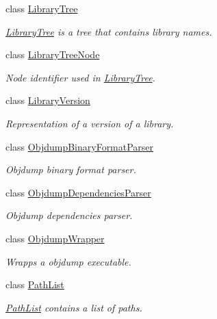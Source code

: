 \begin{DoxyCompactItemize}
class \hyperlink{class_mdt_1_1_deploy_utils_1_1_library_tree}{Library\+Tree}
\begin{DoxyCompactList}\small\item\em \hyperlink{class_mdt_1_1_deploy_utils_1_1_library_tree}{Library\+Tree} is a tree that contains library names. \end{DoxyCompactList}\item 
class \hyperlink{class_mdt_1_1_deploy_utils_1_1_library_tree_node}{Library\+Tree\+Node}
\begin{DoxyCompactList}\small\item\em Node identifier used in \hyperlink{class_mdt_1_1_deploy_utils_1_1_library_tree}{Library\+Tree}. \end{DoxyCompactList}\item 
class \hyperlink{class_mdt_1_1_deploy_utils_1_1_library_version}{Library\+Version}
\begin{DoxyCompactList}\small\item\em Representation of a version of a library. \end{DoxyCompactList}\item 
class \hyperlink{class_mdt_1_1_deploy_utils_1_1_objdump_binary_format_parser}{Objdump\+Binary\+Format\+Parser}
\begin{DoxyCompactList}\small\item\em Objdump binary format parser. \end{DoxyCompactList}\item 
class \hyperlink{class_mdt_1_1_deploy_utils_1_1_objdump_dependencies_parser}{Objdump\+Dependencies\+Parser}
\begin{DoxyCompactList}\small\item\em Objdump dependencies parser. \end{DoxyCompactList}\item 
class \hyperlink{class_mdt_1_1_deploy_utils_1_1_objdump_wrapper}{Objdump\+Wrapper}
\begin{DoxyCompactList}\small\item\em Wrapps a objdump executable. \end{DoxyCompactList}\item 
class \hyperlink{class_mdt_1_1_deploy_utils_1_1_path_list}{Path\+List}
\begin{DoxyCompactList}\small\item\em \hyperlink{class_mdt_1_1_deploy_utils_1_1_path_list}{Path\+List} contains a list of paths. \end{DoxyCompactList}\item 

\end{DoxyCompactItemize}
